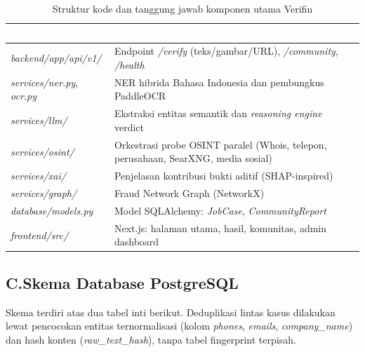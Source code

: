 \documentclass[12pt,a4paper]{article}
\newcommand{\thead}[1]{\textcolor{white}{\textbf{#1}}}
\renewcommand{\arraystretch}{1.08}
\begin{document}
\begin{adjustwidth}{0.50cm}{0pt}
\begin{table}[H]
\centering
\caption{Struktur kode dan tanggung jawab komponen utama Verifin}
\label{tab:struktur-kode}
\small
\renewcommand{\arraystretch}{1.15}
\begin{tabularx}{\linewidth}{@{}p{4.5cm}Y@{}}
\toprule
{}\thead{Modul} & \thead{Tanggung Jawab} \\
\midrule
{}
\textit{backend/app/api/v1/} & Endpoint \textit{/verify} (teks/gambar/URL), \textit{/community}, \textit{/health} \\
\textit{services/ner.py}, \textit{ocr.py} & NER hibrida Bahasa Indonesia dan pembungkus PaddleOCR \\
\textit{services/llm/} & Ekstraksi entitas semantik dan \textit{reasoning engine} verdict \\
\textit{services/osint/} & Orkestrasi probe OSINT paralel (Whois, telepon, perusahaan, SearXNG, media sosial) \\
\textit{services/xai/} & Penjelasan kontribusi bukti aditif (SHAP-inspired) \\
\textit{services/graph/} & Fraud Network Graph (NetworkX) \\
\textit{database/models.py} & Model SQLAlchemy: \textit{JobCase}, \textit{CommunityReport} \\
\textit{frontend/src/} & Next.js: halaman utama, hasil, komunitas, admin dashboard \\
\bottomrule
\end{tabularx}
\end{table}
\end{adjustwidth}

\subsection*{C.\quad Skema Database PostgreSQL}

Skema terdiri atas dua tabel inti berikut. Deduplikasi lintas kasus dilakukan lewat pencocokan
entitas ternormalisasi (kolom \textit{phones}, \textit{emails}, \textit{company\_name}) dan hash
konten (\textit{raw\_text\_hash}), tanpa tabel fingerprint terpisah.
\end{document}
